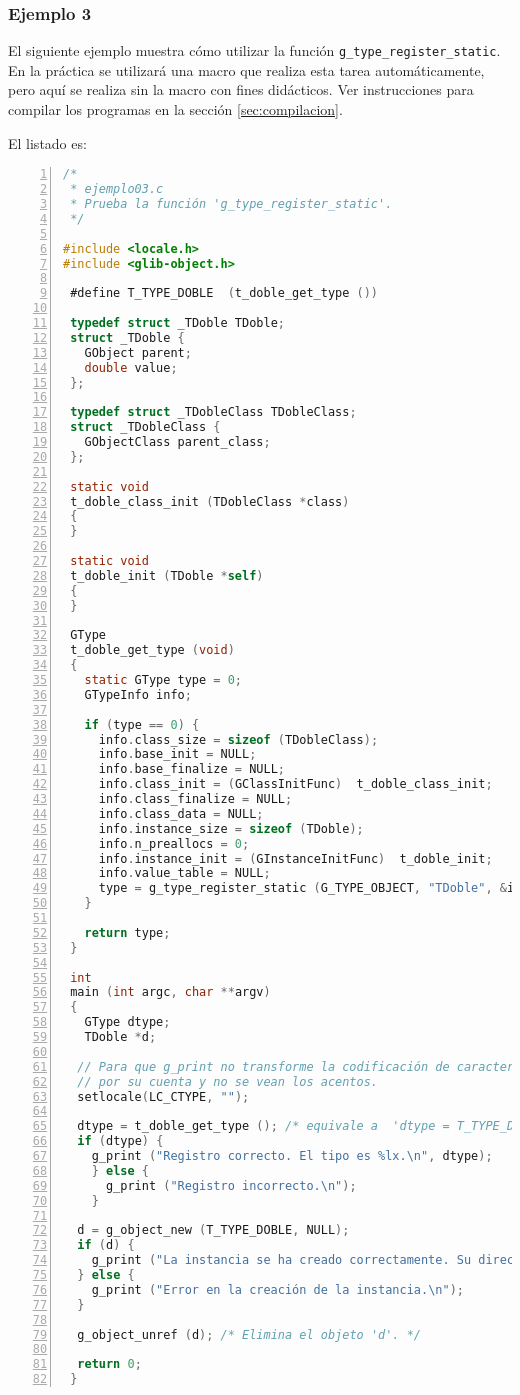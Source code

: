 \subsubsection{Ejemplo 3}
El siguiente ejemplo muestra cómo utilizar la función \texttt{g\_type\_register\_static}.
En la práctica se utilizará una macro que realiza esta tarea automáticamente, pero aquí se realiza sin
la macro con fines didácticos.
Ver instrucciones para compilar los programas en la sección \ref{sec:compilacion}.

El listado es:
\begin{lstlisting}[language=C, numbers=left]
/*
 * ejemplo03.c
 * Prueba la función 'g_type_register_static'.
 */

#include <locale.h>
#include <glib-object.h>
 
 #define T_TYPE_DOBLE  (t_doble_get_type ())
 
 typedef struct _TDoble TDoble;
 struct _TDoble {
   GObject parent;
   double value;
 };
 
 typedef struct _TDobleClass TDobleClass;
 struct _TDobleClass {
   GObjectClass parent_class;
 };
 
 static void
 t_doble_class_init (TDobleClass *class)
 {
 }
 
 static void
 t_doble_init (TDoble *self)
 {
 }
 
 GType
 t_doble_get_type (void)
 {
   static GType type = 0;
   GTypeInfo info;
 
   if (type == 0) {
     info.class_size = sizeof (TDobleClass);
     info.base_init = NULL;
     info.base_finalize = NULL;
     info.class_init = (GClassInitFunc)  t_doble_class_init;
     info.class_finalize = NULL;
     info.class_data = NULL;
     info.instance_size = sizeof (TDoble);
     info.n_preallocs = 0;
     info.instance_init = (GInstanceInitFunc)  t_doble_init;
     info.value_table = NULL;
     type = g_type_register_static (G_TYPE_OBJECT, "TDoble", &info, 0);
   }
   
   return type;
 }
 
 int
 main (int argc, char **argv)
 {
   GType dtype;
   TDoble *d;

  // Para que g_print no transforme la codificación de caracteres
  // por su cuenta y no se vean los acentos.
  setlocale(LC_CTYPE, "");
   
  dtype = t_doble_get_type (); /* equivale a  'dtype = T_TYPE_DOBLE' */
  if (dtype) {
    g_print ("Registro correcto. El tipo es %lx.\n", dtype);
    } else {
      g_print ("Registro incorrecto.\n");
    }
 
  d = g_object_new (T_TYPE_DOBLE, NULL);
  if (d) {
    g_print ("La instancia se ha creado correctamente. Su dirección es %p.\n", d);
  } else {
    g_print ("Error en la creación de la instancia.\n");
  }
  
  g_object_unref (d); /* Elimina el objeto 'd'. */
  
  return 0;
 }
 \end{lstlisting}


